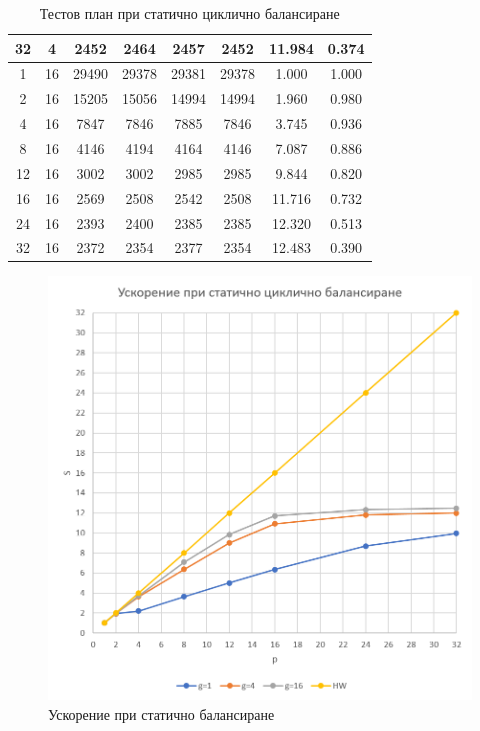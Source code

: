 \documentclass[a4paper,11pt]{article}
\begin{document}
\begin{table}[H]
\begin{tabular}{|c|c|c|c|c|c|c|c|}
        32 & 4 & 2452 & 2464 & 2457 & 2452 & 11.984 & 0.374 \\ \hline
        1 & 16 & 29490 & 29378 & 29381 & 29378 & 1.000 & 1.000 \\ \hline
        2 & 16 & 15205 & 15056 & 14994 & 14994 & 1.960 & 0.980 \\ \hline
        4 & 16 & 7847 & 7846 & 7885 & 7846 & 3.745 & 0.936 \\ \hline
        8 & 16 & 4146 & 4194 & 4164 & 4146 & 7.087 & 0.886 \\ \hline
        12 & 16 & 3002 & 3002 & 2985 & 2985 & 9.844 & 0.820 \\ \hline
        16 & 16 & 2569 & 2508 & 2542 & 2508 & 11.716 & 0.732 \\ \hline
        24 & 16 & 2393 & 2400 & 2385 & 2385 & 12.320 & 0.513 \\ \hline
        32 & 16 & 2372 & 2354 & 2377 & 2354 & 12.483 & 0.390 \\ \hline
    \end{tabular}
    \caption{Тестов план при статично циклично балансиране}
\end{table}
\begin{figure}[H]
    \centering
    \includegraphics[width = 0.9\linewidth]{images/StaticMandelSpeedup.png}
    \caption{Ускорение при статично балансиране}
    \label{fig:static-speedup}
\end{figure}
\end{document}
